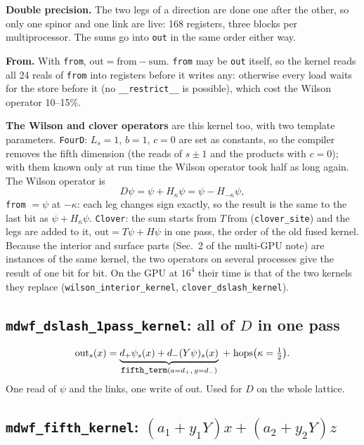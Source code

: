 \documentclass[11pt,a4paper]{article}
\numberwithin{equation}{section}
\newcommand{\code}[1]{\texttt{\small #1}}
\begin{document}
\textbf{Double precision.} The two legs of a direction are done one after the other, so only one
spinor and one link are live: 168 registers, three blocks per multiprocessor. The sums go into
\code{out} in the same order either way.

\textbf{From.} With \code{from}, $\text{out}=\text{from}-\text{sum}$. \code{from} may be \code{out}
itself, so the kernel reads all 24 reals of \code{from} into registers before it writes any:
otherwise every load waits for the store before it (no \code{\_\_restrict\_\_} is possible), which
cost the Wilson operator 10--15\%.

\textbf{The Wilson and clover operators} are this kernel too, with two template parameters.
\code{FourD}: $L_s=1$, $b=1$, $c=0$ are set as constants, so the compiler removes the fifth
dimension (the reads of $s\pm1$ and the products with $c=0$); with them known only at run time
the Wilson operator took half as long again. The Wilson operator is
\begin{equation}
D\psi = \psi + H_\kappa\psi = \psi - H_{-\kappa}\psi ,
\end{equation}
\code{from} $=\psi$ at $-\kappa$: each leg changes sign exactly, so the result is the same to the
last bit as $\psi + H_\kappa\psi$. \code{Clover}: the sum starts from $T\,\text{from}$
(\code{clover\_site}) and the legs are added to it, $\text{out}=T\psi+H\psi$ in one pass, the order
of the old fused kernel. Because the interior and surface parts (Sec.~2 of the multi-GPU note)
are instances of the same kernel, the two operators on several processes give the result of one
bit for bit. On the GPU at $16^4$ their time is that of the two kernels they replace
(\code{wilson\_interior\_kernel}, \code{clover\_dslash\_kernel}).

\subsection{\code{mdwf\_dslash\_1pass\_kernel}: all of $D$ in one pass}

\begin{equation}
\text{out}_s(x) = \underbrace{d_+\psi_s(x) + d_-(Y\psi)_s(x)}_{\code{fifth\_term}(a=d_+,\,y=d_-)} \;+\; \text{hops}\big(\kappa=\tfrac12\big).
\end{equation}
One read of $\psi$ and the links, one write of out. Used for $D$ on the whole lattice.

\subsection{\code{mdwf\_fifth\_kernel}: $(a_1+y_1Y)x + (a_2+y_2Y)z$}
\end{document}
